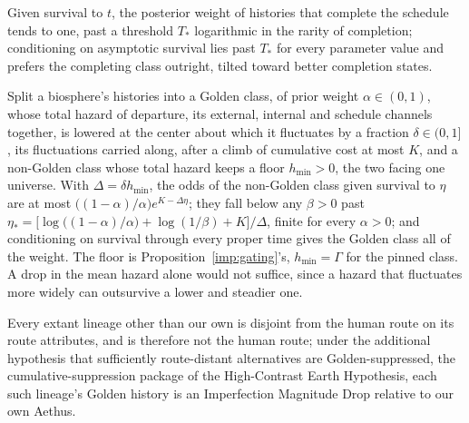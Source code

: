 \begin{proposition}\label{imp:threshold}
Given survival to $t$, the posterior weight of histories that complete
the schedule tends to one, past a threshold $T_\ast$ logarithmic in the
rarity of completion; conditioning on asymptotic survival lies past
$T_\ast$ for every parameter value and prefers the completing class
outright, tilted toward better completion states.
\end{proposition}

\begin{theorem}[Emergence; \textbf{[P]} given its
hypotheses, in \cite{GoldenTechnoanatomy}]\label{imp:emergence}
Split a biosphere's histories into a Golden class, of prior weight
$\alpha\in(0,1)$, whose total hazard of departure, its external,
internal and schedule channels together, is lowered at the center about
which it fluctuates by a fraction $\delta\in(0,1]$, its fluctuations
carried along, after a climb of cumulative cost at most $K$, and a
non-Golden class whose total hazard keeps a floor $h_{\min}>0$, the two
facing one universe. With $\Delta=\delta h_{\min}$, the odds of the
non-Golden class given survival to $\eta$ are at most
$\bigl((1-\alpha)/\alpha\bigr)e^{K-\Delta\eta}$; they fall below any
$\beta>0$ past
$\eta_\ast=\bigl[\log\bigl((1-\alpha)/\alpha\bigr)+\log(1/\beta)+K\bigr]/\Delta$,
finite for every $\alpha>0$; and conditioning on survival through every
proper time gives the Golden class all of the weight. The floor is
Proposition~\ref{imp:gating}'s, $h_{\min}=\Gamma$ for the pinned class.
A drop in the mean hazard alone would not suffice, since a hazard that
fluctuates more widely can outsurvive a lower and steadier one.
\end{theorem}

\begin{lemma}
\label{imp:condimd}
Every extant lineage other than our own is disjoint from the human
route on its route attributes, and is therefore not the human route;
under the additional hypothesis that sufficiently route-distant
alternatives are Golden-suppressed, the cumulative-suppression package
of the High-Contrast Earth Hypothesis, each such lineage's Golden
history is an Imperfection Magnitude Drop relative to our own Aethus.
\end{lemma}

